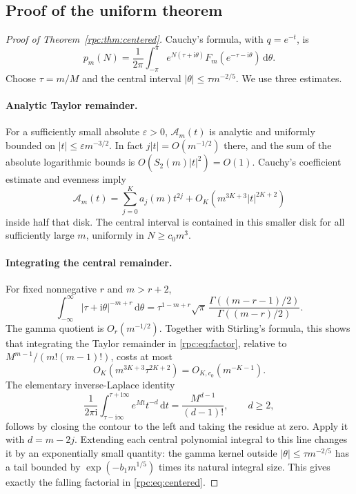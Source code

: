 \documentclass[11pt]{article}
\theoremstyle{definition}
\theoremstyle{remark}
\newcommand{\ii}{\mathrm i}
\newcommand{\dd}{\,\mathrm d}
\numberwithin{equation}{section}
\begin{document}
\subsection{Proof of the uniform theorem}
\begin{proof}[Proof of Theorem~\ref{rpc:thm:centered}]
Cauchy's formula, with $q=e^{-t}$, is
\begin{equation}\label{rpc:eq:cauchy}
 p_m(N)=\frac1{2\pi}\int_{-\pi}^{\pi}
       e^{N(\tau+\ii\theta)}F_m(e^{-\tau-\ii\theta})\dd\theta.
\end{equation}
Choose $\tau=m/M$ and the central interval
$|\theta|\le\tau m^{-2/5}$. We use three estimates.

\paragraph{Analytic Taylor remainder.}
For a sufficiently small absolute $\varepsilon>0$,
$\mathcal A_m(t)$ is analytic and uniformly bounded on
$|t|\le\varepsilon m^{-3/2}$. In fact $j|t|=O(m^{-1/2})$ there, and the
sum of the absolute logarithmic bounds is
$O(S_2(m)|t|^2)=O(1)$. Cauchy's coefficient estimate and evenness imply
\[
 \mathcal A_m(t)=\sum_{j=0}^K a_j(m)t^{2j}
        +O_K\!\left(m^{3K+3}|t|^{2K+2}\right)
\]
inside half that disk. The central interval is contained in this smaller
disk for all sufficiently large $m$, uniformly in $N\ge c_0m^3$.

\paragraph{Integrating the central remainder.}
For fixed nonnegative $r$ and $m>r+2$,
\[
 \int_{-\infty}^{\infty}|\tau+\ii\theta|^{-m+r}\dd\theta
 =\tau^{1-m+r}\sqrt\pi\,
       \frac{\Gamma((m-r-1)/2)}{\Gamma((m-r)/2)}.
\]
The gamma quotient is $O_r(m^{-1/2})$. Together with Stirling's formula,
this shows that integrating the Taylor remainder in \eqref{rpc:eq:factor},
relative to $M^{m-1}/(m!(m-1)!)$, costs at most
\[
 O_K\!\left(m^{3K+3}\tau^{2K+2}\right)
 =O_{K,c_0}(m^{-K-1}).
\]
The elementary inverse-Laplace identity
\[
 \frac1{2\pi\ii}\int_{\tau-\ii\infty}^{\tau+\ii\infty}
       e^{Mt}t^{-d}\dd t=\frac{M^{d-1}}{(d-1)!},\qquad d\ge2,
\]
follows by closing the contour to the left and taking the residue at zero.
Apply it with $d=m-2j$. Extending each central polynomial integral to this
line changes it by an exponentially small quantity: the gamma kernel outside
$|\theta|\le\tau m^{-2/5}$ has a tail bounded by
$\exp(-b_1m^{1/5})$ times its natural integral size. This gives exactly the
falling factorial in \eqref{rpc:eq:centered}.


\end{proof}
\end{document}
